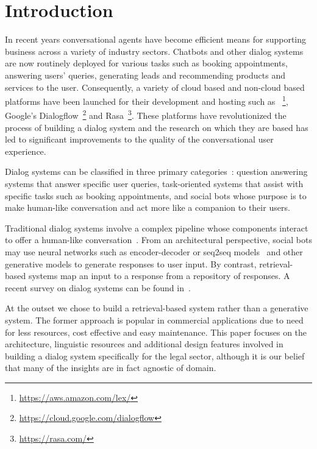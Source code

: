\documentclass[runningheads]{llncs}
\begin{document}
\section{Introduction}
In recent years conversational agents have become efficient means for supporting business across a variety of industry sectors. Chatbots and other dialog systems are now routinely deployed for various tasks such as booking appointments, answering users' queries, generating leads and recommending products and services to the user. Consequently, a variety of cloud based and non-cloud based platforms have been launched for their development and hosting such as %
\aws \lex~\footnote{\url{https://aws.amazon.com/lex/}}, Google's Dialogflow~\footnote{\url{https://cloud.google.com/dialogflow}} and Rasa~\footnote{\url{https://rasa.com/}}. 
These platforms have revolutionized the process of building a dialog system and the research on which they are based has led to significant improvements to the quality of the conversational user experience. 

Dialog systems can be classified in three primary categories~\cite{gao2018neural}: question answering systems that answer specific user queries, task-oriented systems that assist with specific tasks such as booking appointments, and social bots whose purpose is to make human-like conversation and act more like a companion to their users. 

Traditional dialog systems involve a complex pipeline whose components interact to offer a human-like conversation~\cite{zue2000juplter}.
From an architectural perspective, social bots may use neural networks such as encoder-decoder or seq2seq models~\cite{serban2015building,vinyals2015neural,bordes2016learning} and other generative models to generate responses to user input. By contrast, retrieval-based systems map an input to a response from a repository of responses. A recent survey on dialog systems can be found in~\cite{chen2017survey,chen2018deep,serban2015survey}. 

At the outset we chose to build a retrieval-based system rather than a generative system. The former approach is popular in commercial applications due to need for less resources, cost effective and easy maintenance. This paper focuses on the architecture, linguistic resources and additional design features involved in building a dialog system specifically for the legal sector, although it is our belief that many of the insights are in fact agnostic of domain.
\end{document}
